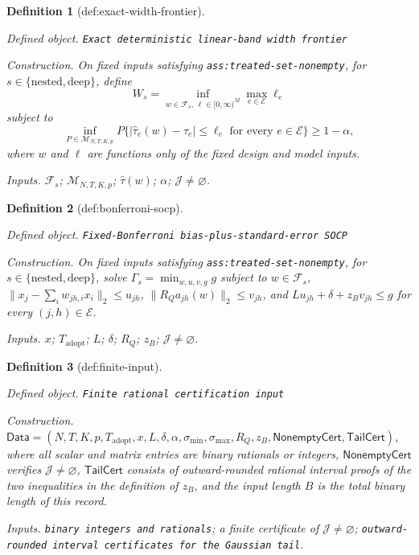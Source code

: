 \documentclass{article}
\newtheorem{definition}{Definition}
\begin{document}
\begin{definition}[def:exact-width-frontier]\label{def:exact-width-frontier}
\par\smallskip\noindent\emph{Defined object.} \texttt{Exact deterministic linear-\allowbreak{}band width frontier}
\par\smallskip\noindent\emph{Construction.} On fixed inputs satisfying \texttt{ass:treated-set-nonempty}, for
\(s\in\{\mathrm{nested},\mathrm{deep}\}\), define
\[
 W_s=\inf_{w\in\mathcal F_s,\,\ell\in[0,\infty)^M}
 \max_{e\in\mathcal E}\ell_e
\]
subject to
\[
 \inf_{P\in\mathcal M_{N,T,K,p}}
 P\{ |\widehat\tau_e(w)-\tau_e|\leq\ell_e
       \text{ for every }e\in\mathcal E\}\geq1-\alpha,
\]
where \(w\) and \(\ell\) are functions only of the fixed design and model
inputs.
\par\smallskip\noindent\emph{Inputs.} \(\mathcal F_s\); \(\mathcal M_{N,T,K,p}\); \(\widehat\tau(w)\); \(\alpha\); \(\mathcal J\ne\varnothing\).
\end{definition}

\begin{definition}[def:bonferroni-socp]\label{def:bonferroni-socp}
\par\smallskip\noindent\emph{Defined object.} \texttt{Fixed-\allowbreak{}Bonferroni bias-\allowbreak{}plus-\allowbreak{}standard-\allowbreak{}error SOCP}
\par\smallskip\noindent\emph{Construction.} On fixed inputs satisfying \texttt{ass:treated-set-nonempty}, for
\(s\in\{\mathrm{nested},\mathrm{deep}\}\), solve
\(\Gamma_s=\min_{w,u,v,g}g\) subject to \(w\in\mathcal F_s\),
\(\lVert x_j-\sum_iw_{jh,i}x_i\rVert_2\leq u_{jh}\),
\(\lVert R_Qa_{jh}(w)\rVert_2\leq v_{jh}\), and
\(Lu_{jh}+\delta+z_Bv_{jh}\leq g\) for every
\((j,h)\in\mathcal E\).
\par\smallskip\noindent\emph{Inputs.} \(x\); \(T_{\mathrm{adopt}}\); \(L\); \(\delta\); \(R_Q\); \(z_B\); \(\mathcal J\ne\varnothing\).
\end{definition}

\begin{definition}[def:finite-input]\label{def:finite-input}
\par\smallskip\noindent\emph{Defined object.} \texttt{Finite rational certification input}
\par\smallskip\noindent\emph{Construction.} \(\mathsf{Data}=(N,T,K,p,T_{\mathrm{adopt}},x,L,\delta,\alpha,
\sigma_{\min},\sigma_{\max},R_Q,z_B,\mathsf{NonemptyCert},
\mathsf{TailCert})\), where all scalar and matrix entries are binary rationals
or integers, \(\mathsf{NonemptyCert}\) verifies
\(\mathcal J\ne\varnothing\), \(\mathsf{TailCert}\) consists of
outward-rounded rational interval proofs of the two inequalities in the
definition of \(z_B\), and the input length \(B\) is the total binary length
of this record.
\par\smallskip\noindent\emph{Inputs.} \texttt{binary integers and rationals}; a finite certificate of \(\mathcal J\ne\varnothing\); \texttt{outward-\allowbreak{}rounded interval certificates for the Gaussian tail}.
\end{definition}
\end{document}
